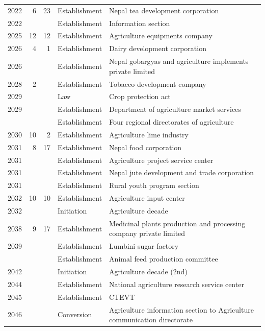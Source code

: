 \documentclass[
  openany]{book}
\begin{document}
\begin{longtable}[t]{rrrl>{\raggedright\arraybackslash}p{16em}}
2022 & 6 & 23 & Establishment & Nepal tea development corporation\\
\rowcolor{gray!6}  2022 &  &  & Establishment & Information section\\
2025 & 12 & 12 & Establishment & Agriculture equipments company\\
\addlinespace
\rowcolor{gray!6}  2026 & 4 & 1 & Establishment & Dairy development corporation\\
2026 &  &  & Establishment & Nepal gobargyas and agriculture implements private limited\\
\rowcolor{gray!6}  2028 & 2 &  & Establishment & Tobacco development company\\
2029 &  &  & Law & Crop protection act\\
\rowcolor{gray!6}  2029 &  &  & Establishment & Department of agriculture market services\\
\addlinespace
2029 &  &  & Establishment & Four regional directorates of agriculture\\
\rowcolor{gray!6}  2030 & 10 & 2 & Establishment & Agriculture lime industry\\
2031 & 8 & 17 & Establishment & Nepal food corporation\\
\rowcolor{gray!6}  2031 &  &  & Establishment & Agriculture project service center\\
2031 &  &  & Establishment & Nepal jute development and trade corporation\\
\addlinespace
\rowcolor{gray!6}  2031 &  &  & Establishment & Rural youth program section\\
2032 & 10 & 10 & Establishment & Agriculture input center\\
\rowcolor{gray!6}  2032 &  &  & Initiation & Agriculture decade\\
2038 & 9 & 17 & Establishment & Medicinal plants production and processing company private limited\\
\rowcolor{gray!6}  2039 &  &  & Establishment & Lumbini sugar factory\\
\addlinespace
2041 &  &  & Establishment & Animal feed production committee\\
\rowcolor{gray!6}  2042 &  &  & Initiation & Agriculture decade (2nd)\\
2044 &  &  & Establishment & National agriculture research service center\\
\rowcolor{gray!6}  2045 &  &  & Establishment & CTEVT\\
2046 &  &  & Conversion & Agriculture information section to Agriculture communication directorate\\

\end{longtable}
\end{document}
